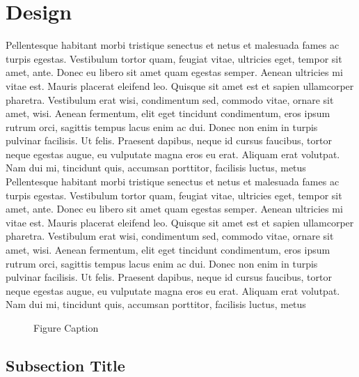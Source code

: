 
\section{Design}\label{sec:design}
Pellentesque habitant morbi tristique senectus et netus et malesuada fames ac turpis egestas. Vestibulum tortor quam, feugiat vitae, ultricies eget, tempor sit amet, ante. Donec eu libero sit amet quam egestas semper. Aenean ultricies mi vitae est. Mauris placerat eleifend leo. Quisque sit amet est et sapien ullamcorper pharetra. Vestibulum erat wisi, condimentum sed, commodo vitae, ornare sit amet, wisi. Aenean fermentum, elit eget tincidunt condimentum, eros ipsum rutrum orci, sagittis tempus lacus enim ac dui. Donec non enim in turpis pulvinar facilisis. Ut felis. Praesent dapibus, neque id cursus faucibus, tortor neque egestas augue, eu vulputate magna eros eu erat. Aliquam erat volutpat. Nam dui mi, tincidunt quis, accumsan porttitor, facilisis luctus, metus
Pellentesque habitant morbi tristique senectus et netus et malesuada fames ac turpis egestas. Vestibulum tortor quam, feugiat vitae, ultricies eget, tempor sit amet, ante. Donec eu libero sit amet quam egestas semper. Aenean ultricies mi vitae est. Mauris placerat eleifend leo. Quisque sit amet est et sapien ullamcorper pharetra. Vestibulum erat wisi, condimentum sed, commodo vitae, ornare sit amet, wisi. Aenean fermentum, elit eget tincidunt condimentum, eros ipsum rutrum orci, sagittis tempus lacus enim ac dui. Donec non enim in turpis pulvinar facilisis. Ut felis. Praesent dapibus, neque id cursus faucibus, tortor neque egestas augue, eu vulputate magna eros eu erat. Aliquam erat volutpat. Nam dui mi, tincidunt quis, accumsan porttitor, facilisis luctus, metus

\begin{figure}[t!]
	\centering
	\caption{Figure Caption}
	\label{fig:fig3}
\end{figure}

\subsection{Subsection Title}


